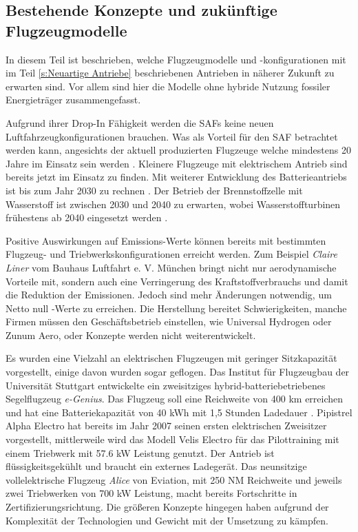 \subsection{Bestehende Konzepte und zukünftige Flugzeugmodelle}
In diesem Teil ist beschrieben, welche Flugzeugmodelle und -konfigurationen 
mit im Teil \ref{s:Neuartige Antriebe} beschriebenen Antrieben in näherer Zukunft zu erwarten sind. 
Vor allem sind hier die Modelle ohne hybride Nutzung fossiler Energieträger zusammengefasst.

Aufgrund ihrer Drop-In Fähigkeit werden die SAFs keine neuen Luftfahrzeugkonfigurationen brauchen. 
Was als Vorteil für den SAF betrachtet werden kann, 
angesichts der aktuell produzierten Flugzeuge welche
mindestens 20 Jahre im Einsatz sein werden \cite{austr}.  
Kleinere Flugzeuge mit elektrischem Antrieb sind bereits jetzt im Einsatz zu finden. 
Mit weiterer Entwicklung des Batterieantriebs ist bis zum Jahr 2030 zu rechnen \cite{austr}.  %
Der Betrieb der Brennstoffzelle mit Wasserstoff ist zwischen 2030 und 2040 zu erwarten, 
wobei Wasserstoffturbinen frühestens ab 2040 eingesetzt werden \cite{austr}. 

%
Positive Auswirkungen auf Emissions-Werte können bereits mit bestimmten 
Flugzeug- und Triebwerkskonfigurationen erreicht werden.
Zum Beispiel \textit{Claire Liner} vom Bauhaus Luftfahrt e. V. München 
bringt nicht nur aerodynamische Vorteile mit, sondern auch eine Verringerung 
des Kraftstoffverbrauchs und damit die Reduktion der Emissionen.
Jedoch sind mehr Änderungen notwendig, um Netto null -Werte zu erreichen.
Die Herstellung bereitet Schwierigkeiten, manche Firmen müssen den Geschäftsbetrieb einstellen, 
wie Universal Hydrogen oder Zunum Aero, oder Konzepte werden nicht weiterentwickelt.

Es wurden eine Vielzahl an elektrischen Flugzeugen mit geringer 
Sitzkapazität vorgestellt, einige davon wurden sogar geflogen.
Das Institut für Flugzeugbau der Universität Stuttgart entwickelte 
ein zweisitziges hybrid-batteriebetriebenes Segelflugzeug \textit{e-Genius}. 
Das Flugzeug soll eine Reichweite von 400 km erreichen und hat eine 
Batteriekapazität von 40 kWh mit 1,5 Stunden Ladedauer \cite{IFB_eGenius_2025}.
Pipistrel Alpha Electro hat bereits im Jahr 2007 seinen ersten elektrischen Zweisitzer vorgestellt, 
mittlerweile wird das Modell \glqq Velis Electro\grqq{} \cite{Pipistrel_VelisElectro} für 
das Pilottraining mit einem Triebwerk mit 57.6 kW Leistung genutzt. 
Der Antrieb ist flüssigkeitsgekühlt und braucht ein externes Ladegerät. 
Das neunsitzige vollelektrische Flugzeug \textit{Alice} von Eviation, 
mit 250 NM Reichweite und jeweils zwei Triebwerken von 700 kW Leistung,
macht bereits Fortschritte in Zertifizierungsrichtung.
%
Die größeren Konzepte hingegen haben aufgrund der Komplexität der Technologien 
und Gewicht mit der Umsetzung zu kämpfen.\\

